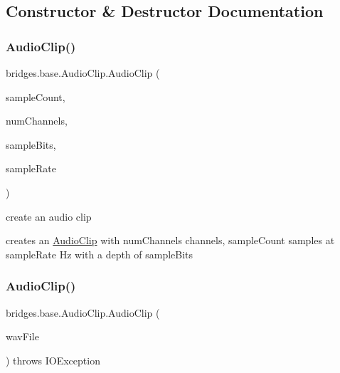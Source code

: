 \subsection{Constructor \& Destructor Documentation}
\mbox{\label{classbridges_1_1base_1_1_audio_clip_a83e87997fd53dbcbde7680b90c1ff3f2}} 
\subsubsection{\texorpdfstring{Audio\+Clip()}{AudioClip()}\hspace{0.1cm}{\footnotesize\ttfamily [1/4]}}
{\footnotesize\ttfamily bridges.\+base.\+Audio\+Clip.\+Audio\+Clip (\begin{DoxyParamCaption}\item[{int}]{sample\+Count,  }\item[{int}]{num\+Channels,  }\item[{int}]{sample\+Bits,  }\item[{int}]{sample\+Rate }\end{DoxyParamCaption})}



create an audio clip 

creates an \hyperlink{classbridges_1_1base_1_1_audio_clip}{Audio\+Clip} with num\+Channels channels, sample\+Count samples at sample\+Rate Hz with a depth of sample\+Bits \mbox{\label{classbridges_1_1base_1_1_audio_clip_aece4ed61f09688a54e636ce3dc206239}} 
\subsubsection{\texorpdfstring{Audio\+Clip()}{AudioClip()}\hspace{0.1cm}{\footnotesize\ttfamily [2/4]}}
{\footnotesize\ttfamily bridges.\+base.\+Audio\+Clip.\+Audio\+Clip (\begin{DoxyParamCaption}\item[{Wav\+File}]{wav\+File }\end{DoxyParamCaption}) throws I\+O\+Exception}



